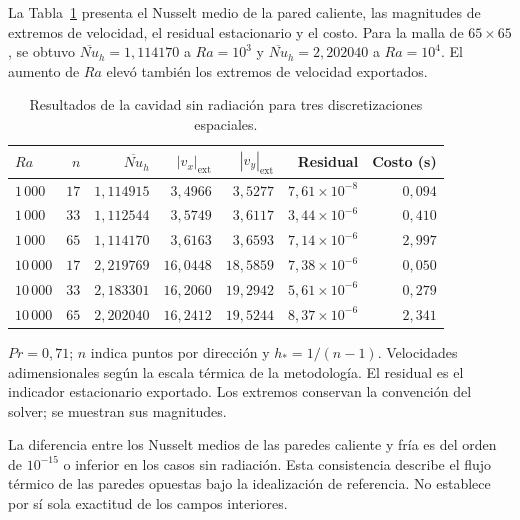 La Tabla~\ref{tab:res_cavidad_espacial} presenta el Nusselt medio de la pared caliente, las magnitudes de extremos de velocidad, el residual estacionario y el costo. Para la malla de $65\times65$, se obtuvo $\overline{Nu}_h=1{,}114170$ a $Ra=10^3$ y $\overline{Nu}_h=2{,}202040$ a $Ra=10^4$. El aumento de $Ra$ elevó también los extremos de velocidad exportados.

\begin{table}[htbp]
\centering
\caption{Resultados de la cavidad sin radiación para tres discretizaciones espaciales.}
\label{tab:res_cavidad_espacial}
\small
\setlength{\tabcolsep}{5pt}
\begin{tabular}{lrrrrrr}
\toprule
$Ra$ & $n$ & $\overline{Nu}_h$ & $|v_x|_{\mathrm{ext}}$ & $|v_y|_{\mathrm{ext}}$ & Residual & Costo (s) \\
\midrule
$1\,000$ & $17$ & $1{,}114915$ & $3{,}4966$ & $3{,}5277$ & $7{,}61\times10^{-8}$ & $0{,}094$ \\
$1\,000$ & $33$ & $1{,}112544$ & $3{,}5749$ & $3{,}6117$ & $3{,}44\times10^{-6}$ & $0{,}410$ \\
$1\,000$ & $65$ & $1{,}114170$ & $3{,}6163$ & $3{,}6593$ & $7{,}14\times10^{-6}$ & $2{,}997$ \\
$10\,000$ & $17$ & $2{,}219769$ & $16{,}0448$ & $18{,}5859$ & $7{,}38\times10^{-6}$ & $0{,}050$ \\
$10\,000$ & $33$ & $2{,}183301$ & $16{,}2060$ & $19{,}2942$ & $5{,}61\times10^{-6}$ & $0{,}279$ \\
$10\,000$ & $65$ & $2{,}202040$ & $16{,}2412$ & $19{,}5244$ & $8{,}37\times10^{-6}$ & $2{,}341$ \\
\bottomrule
\end{tabular}
\par\vspace{3pt}
\begin{minipage}{0.98\textwidth}\footnotesize
$Pr=0{,}71$; $n$ indica puntos por dirección y $h_*=1/(n-1)$. Velocidades adimensionales según la escala térmica de la metodología. El residual es el indicador estacionario exportado. Los extremos conservan la convención del solver; se muestran sus magnitudes.
\end{minipage}
\end{table}


La diferencia entre los Nusselt medios de las paredes caliente y fría es del orden de $10^{-15}$ o inferior en los casos sin radiación. Esta consistencia describe el flujo térmico de las paredes opuestas bajo la idealización de referencia. No establece por sí sola exactitud de los campos interiores.

